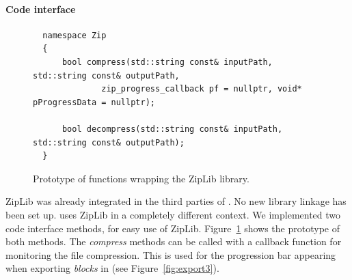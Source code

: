 \paragraph{Code interface}
\begin{figure}
  \centering
  \begin{lstlisting}
  namespace Zip
  {
      bool compress(std::string const& inputPath, std::string const& outputPath,
              zip_progress_callback pf = nullptr, void* pProgressData = nullptr);

      bool decompress(std::string const& inputPath, std::string const& outputPath);
  }
  \end{lstlisting}
  \caption{Prototype of functions wrapping the ZipLib library.}
  \label{fig:code-interface}
\end{figure}
ZipLib was already integrated in the third parties of \CC. No new library linkage has been set up. \CC uses ZipLib in a completely different context. We implemented two code interface methods, for easy use of ZipLib. Figure~\ref{fig:code-interface} shows the prototype of both methods. The  \emph{compress} methods can be called with a callback function for monitoring the file compression. This is used for the progression bar appearing when exporting  \emph{blocks} in \CC (see Figure~\ref{fig:export3}).


